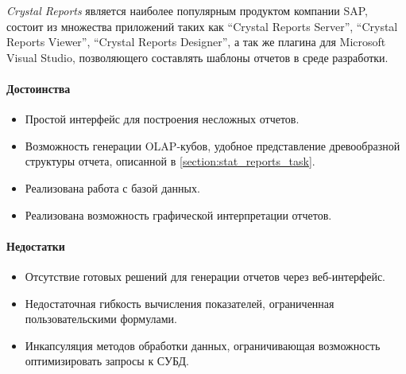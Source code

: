 \textit{Crystal Reports} является наиболее популярным продуктом компании SAP, состоит из
множества приложений таких как ``Crystal Reports Server'', ``Crystal Reports Viewer'',
``Crystal Reports Designer'', а так же плагина для Microsoft Visual Studio, позволяющего
составлять шаблоны отчетов в среде разработки.
 
\paragraph{Достоинства}
\begin{itemize}
\item{
Простой интерфейс для построения несложных отчетов.
}
\item{
Возможность генерации OLAP-кубов\cite{olap}, удобное представление
древообразной структуры отчета, описанной в \ref{section:stat_reports_task}.
}
\item{
Реализована работа с базой данных.
}
\item{
Реализована возможность графической интерпретации отчетов.
}
\end{itemize}

\paragraph{Недостатки}
\begin{itemize}
\item{
Отсутствие готовых решений для генерации отчетов через веб-интерфейс.
}
\item{
Недостаточная гибкость вычисления показателей, ограниченная пользовательскими формулами.
}
\item{
Инкапсуляция методов обработки данных, ограничивающая возможность оптимизировать
запросы к СУБД.
}
\end{itemize}

